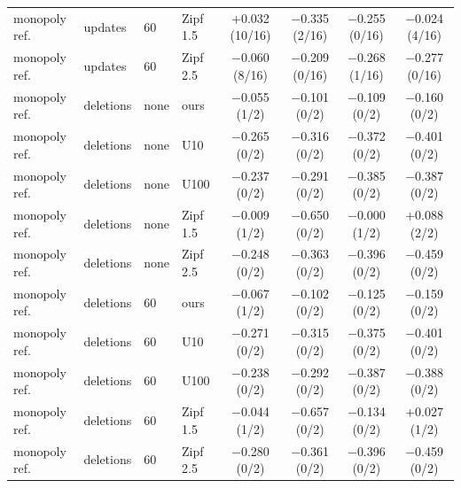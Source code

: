 \begin{table}[tp]
\begin{tabular}{@{}llllcccc@{}}
    monopoly ref. & updates & 60 & Zipf 1.5 & +0.032 (10/16) & $-$0.335 (2/16) & $-$0.255 (0/16) & $-$0.024 (4/16) \\
    monopoly ref. & updates & 60 & Zipf 2.5 & $-$0.060 (8/16) & $-$0.209 (0/16) & $-$0.268 (1/16) & $-$0.277 (0/16) \\
    \midrule
    monopoly ref. & deletions & none & ours & $-$0.055 (1/2) & $-$0.101 (0/2) & $-$0.109 (0/2) & $-$0.160 (0/2) \\
    monopoly ref. & deletions & none & U10 & $-$0.265 (0/2) & $-$0.316 (0/2) & $-$0.372 (0/2) & $-$0.401 (0/2) \\
    monopoly ref. & deletions & none & U100 & $-$0.237 (0/2) & $-$0.291 (0/2) & $-$0.385 (0/2) & $-$0.387 (0/2) \\
    monopoly ref. & deletions & none & Zipf 1.5 & $-$0.009 (1/2) & $-$0.650 (0/2) & $-$0.000 (1/2) & +0.088 (2/2) \\
    monopoly ref. & deletions & none & Zipf 2.5 & $-$0.248 (0/2) & $-$0.363 (0/2) & $-$0.396 (0/2) & $-$0.459 (0/2) \\
    \midrule
    monopoly ref. & deletions & 60 & ours & $-$0.067 (1/2) & $-$0.102 (0/2) & $-$0.125 (0/2) & $-$0.159 (0/2) \\
    monopoly ref. & deletions & 60 & U10 & $-$0.271 (0/2) & $-$0.315 (0/2) & $-$0.375 (0/2) & $-$0.401 (0/2) \\
    monopoly ref. & deletions & 60 & U100 & $-$0.238 (0/2) & $-$0.292 (0/2) & $-$0.387 (0/2) & $-$0.388 (0/2) \\
    monopoly ref. & deletions & 60 & Zipf 1.5 & $-$0.044 (1/2) & $-$0.657 (0/2) & $-$0.134 (0/2) & +0.027 (1/2) \\
    monopoly ref. & deletions & 60 & Zipf 2.5 & $-$0.280 (0/2) & $-$0.361 (0/2) & $-$0.396 (0/2) & $-$0.459 (0/2) \\
    \bottomrule
  \end{tabular}
\end{table}
